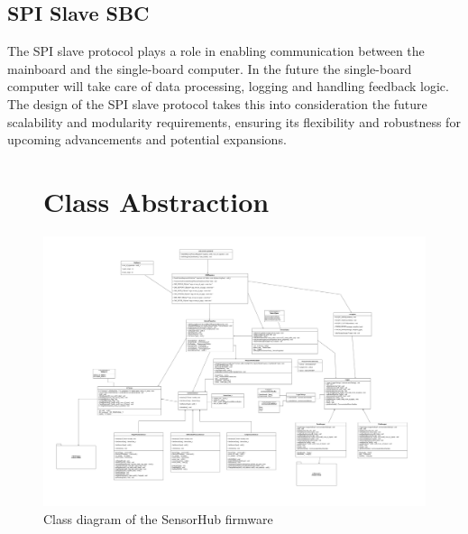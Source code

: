 \subsection{SPI Slave SBC}
The SPI slave protocol plays a role in enabling communication between the mainboard and the single-board computer. In the future the single-board computer will take care of data processing, logging and handling feedback logic. \\
The design of the SPI slave protocol takes this into consideration the future scalability and modularity requirements, ensuring its flexibility and robustness for upcoming advancements and potential expansions.
\pagebreak
\begin{figure}
    \section{Class Abstraction}
    \centering
    \includegraphics[scale=0.65]{figures/SensorHub_Class_Diagram.jpg}
    \caption{Class diagram of the SensorHub firmware}
    \label{fig:SensorHubClassDiagram}
\end{figure}
